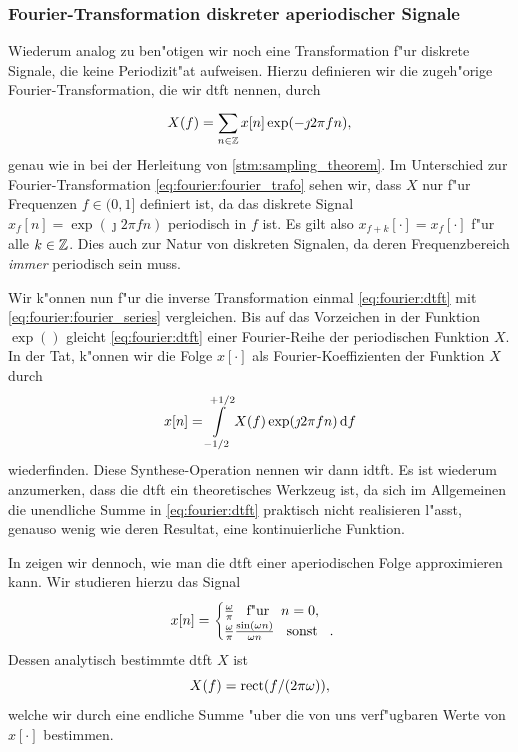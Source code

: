 \subsubsection{Fourier-Transformation diskreter aperiodischer Signale}\label{sec:fourier:disc_aperiod}
%
Wiederum analog zu  ben"otigen wir noch eine Transformation f"ur diskrete Signale, die keine Periodizit"at aufweisen.
Hierzu definieren wir die zugeh"orige Fourier-Transformation, die wir \gls{dtft} nennen, durch
\begin{equation}\label{eq:fourier:dtft}
    X(f) = {\sum\limits_{n \in \mathbb{Z}}^{}{x[n] \exp(-\jmath 2 \pi f n)}},
\end{equation}
genau wie in  bei der Herleitung von \eqref{stm:sampling_theorem}.
Im Unterschied zur  Fourier-Transformation \eqref{eq:fourier:fourier_trafo} sehen wir, dass $X$ nur f"ur Frequenzen $f \in (0,1]$ definiert ist, da das diskrete Signal $x_f[n] = \exp(\jmath 2 \pi f n)$ periodisch in $f$ ist.
Es gilt also $x_{f + k}[\cdot] = x_{f}[\cdot]$ f"ur alle $k \in \mathbb{Z}$.
Dies  auch zur Natur von diskreten Signalen, da deren Frequenzbereich \emph{immer} periodisch sein muss.

Wir k"onnen nun f"ur die inverse Transformation einmal \eqref{eq:fourier:dtft} mit \eqref{eq:fourier:fourier_series} vergleichen. 
Bis auf das Vorzeichen in der Funktion $\exp()$ gleicht \eqref{eq:fourier:dtft} einer Fourier-Reihe der periodischen Funktion $X$.
In der Tat, k"onnen wir die Folge $x[\cdot]$ als Fourier-Koeffizienten der Funktion $X$ durch
\begin{equation}\label{eq:fourier:idtft}
    x[n] = {\int\limits_{-1/2}^{+1/2}{X(f)\exp(\jmath 2 \pi f n)}\,\mathrm{d}{f}}
\end{equation}
wiederfinden.
Diese Synthese-Operation nennen wir dann \gls{idtft}.
Es ist wiederum anzumerken, dass die \gls{dtft}  ein theoretisches Werkzeug ist, da sich im Allgemeinen die unendliche Summe in \eqref{eq:fourier:dtft} praktisch nicht realisieren l"asst, genauso wenig wie deren Resultat, eine kontinuierliche Funktion.

In  zeigen wir dennoch, wie man die \gls{dtft} einer aperiodischen Folge approximieren kann.
Wir studieren hierzu das Signal
\[
x[n] = \begin{cases}
    \frac{\omega}{\pi} {\hspace{3mm} \text{f"ur} \hspace{3mm}} n = 0,\\
    \frac{\omega}{\pi} \frac{\sin(\omega n)}{\omega n} {\hspace{3mm} \text{sonst} \hspace{3mm}}.
\end{cases}
\]
Dessen analytisch bestimmte \gls{dtft} $X$ ist
\[
X(f) = \operatorname*{rect}(f/(2 \pi \omega)),
\]
welche wir durch eine endliche Summe "uber die von uns verf"ugbaren Werte von $x[\cdot]$ bestimmen.

